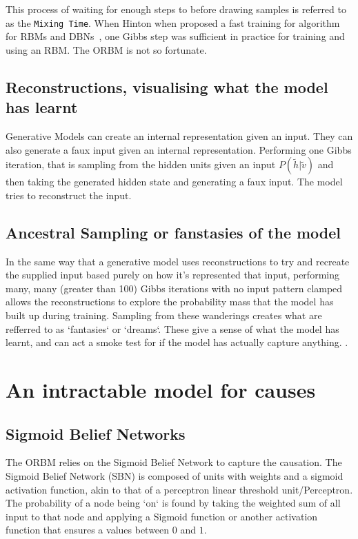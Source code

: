 This process of waiting for enough steps to before drawing samples is referred to as the \texttt{Mixing Time}. When Hinton when proposed a fast training for algorithm for RBMs and DBNs~\cite{Hinton:2006:FLA:1161603.1161605}, one Gibbs step was sufficient in practice for training and using an RBM. The ORBM is not so fortunate.


\subsection{Reconstructions, visualising what the model has learnt}

Generative Models can create an internal representation given an input. They can also generate a faux input given an internal representation. Performing one Gibbs iteration, that is sampling from the hidden units given an input $ P(\tilde{h}|\tilde{v}) $ and then taking the generated hidden state and generating a faux input. The model tries to reconstruct the input.

  \subsection{Ancestral Sampling or fanstasies of the model}

  In the same way that a generative model uses reconstructions to try and recreate the  supplied input based purely on how it's represented that input, performing many, many (greater than 100) Gibbs iterations with no input pattern clamped allows the reconstructions to explore the probability mass that the model has built up during training. Sampling from these wanderings creates what are refferred to as `fantasies` or `dreams`. These give a sense of what the model has learnt, and can act a smoke test for if the model has actually capture anything.
  .

  \section{An intractable model for causes}
    \subsection{Sigmoid Belief Networks}

    The ORBM relies on the Sigmoid Belief Network to capture the causation. The Sigmoid Belief Network (SBN) is composed of units with weights and a sigmoid activation function, akin to that of a perceptron linear threshold unit/Perceptron. The probability of a node being `on` is found by taking the weighted sum of all input to that node and applying a Sigmoid function or another activation function that ensures a values between $0$ and $1$.

